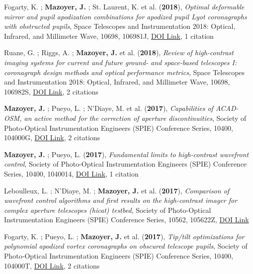 \documentclass[11pt]{article}
\begin{document}
\begin{etaremune} \itemsep 0pt

\item Fogarty, K. ; {\bf Mazoyer, J.} ; St. Laurent, K. et al. ({\bf2018}), {\it Optimal deformable mirror and pupil apodization combinations for apodized pupil Lyot coronagraphs with obstructed pupils}, Space Telescopes and Instrumentation 2018: Optical, Infrared, and Millimeter Wave, 10698, 106981J, \href{https://doi.org/10.1117/12.2314394}{DOI Link}, 1 citation

 \item Ruane, G. ; Riggs, A. ; {\bf Mazoyer, J.} et al. ({\bf2018}), {\it Review of high-contrast imaging systems for current and future ground- and space-based telescopes I: coronagraph design methods and optical performance metrics}, Space Telescopes and Instrumentation 2018: Optical, Infrared, and Millimeter Wave, 10698, 106982S, \href{https://doi.org/10.1117/12.2312948}{DOI Link}, 2 citations

 \item {\bf Mazoyer, J.} ; Pueyo, L. ; N'Diaye, M. et al. ({\bf2017}), {\it Capabilities of ACAD-OSM, an active method for the correction of aperture discontinuities}, Society of Photo-Optical Instrumentation Engineers (SPIE) Conference Series, 10400, 104000G, \href{https://doi.org/10.1117/12.2273070}{DOI Link}, 2 citations

 \item {\bf Mazoyer, J.} ; Pueyo, L. ({\bf2017}), {\it Fundamental limits to high-contrast wavefront control}, Society of Photo-Optical Instrumentation Engineers (SPIE) Conference Series, 10400, 1040014, \href{https://doi.org/10.1117/12.2274657}{DOI Link}, 1 citation

 \item Leboulleux, L. ; N'Diaye, M. ; {\bf Mazoyer, J.} et al. ({\bf2017}), {\it Comparison of wavefront control algorithms and first results on the high-contrast imager for complex aperture telescopes (hicat) testbed}, Society of Photo-Optical Instrumentation Engineers (SPIE) Conference Series, 10562, 105622Z, \href{https://doi.org/10.1117/12.2296154}{DOI Link}

 \item Fogarty, K. ; Pueyo, L. ; {\bf Mazoyer, J.} et al. ({\bf2017}), {\it Tip/tilt optimizations for polynomial apodized vortex coronagraphs on obscured telescope pupils}, Society of Photo-Optical Instrumentation Engineers (SPIE) Conference Series, 10400, 104000T, \href{https://doi.org/10.1117/12.2274603}{DOI Link}, 2 citations


\end{etaremune}
\end{document}
